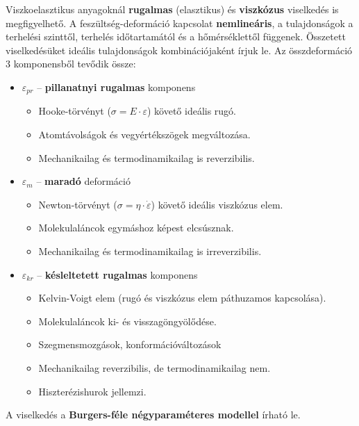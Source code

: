 \documentclass[12pt,a4paper]{article}       %
\begin{document}
\begin{tcbitemize}
  \tcbitem[title={\# \thetcbrasternum{} –
        Mit jelent az, hogy egy polimer viszkoelasztikus?
      }]
  Viszkoelasztikus anyagoknál \textbf{rugalmas} (elasztikus) és
  \textbf{viszkózus} viselkedés is megfigyelhető. A feszültség-deformáció
  kapcsolat \textbf{nemlineáris}, a tulajdonságok a terhelési szinttől,
  terhelés időtartamától és a hőmérséklettől függenek. Összetett viselkedésüket
  ideális tulajdonságok kombinációjaként írjuk le. Az összdeformáció 3
  komponensből tevődik össze:
  \begin{itemize}
    \item $\varepsilon_{pr}$ – \textbf{pillanatnyi rugalmas} komponens
          \begin{itemize}
            \item Hooke-törvényt ($\sigma = E \cdot \varepsilon$) követő
                  ideális rugó.
            \item Atomtávolságok és vegyértékszögek megváltozása.
            \item Mechanikailag és termodinamikailag is reverzibilis.
          \end{itemize}
    \item $\varepsilon_{m}$ – \textbf{maradó} deformáció
          \begin{itemize}
            \item Newton-törvényt ($\sigma = \eta \cdot \dot{\varepsilon}$)
                  követő ideális viszkózus elem.
            \item Molekulaláncok egymáshoz képest elcsúsznak.
            \item Mechanikailag és termodinamikailag is irreverzibilis.
          \end{itemize}
    \item $\varepsilon_{kr}$ – \textbf{késleltetett rugalmas} komponens
          \begin{itemize}
            \item Kelvin-Voigt elem (rugó és viszkózus elem páthuzamos
                  kapcsolása).
            \item Molekulaláncok ki- és visszagöngyölődése.
            \item Szegmensmozgások, konformációváltozások
            \item Mechanikailag reverzibilis, de termodinamikailag nem.
            \item Hiszterézishurok jellemzi.
          \end{itemize}
  \end{itemize}
  A viselkedés a \textbf{Burgers-féle négyparaméteres modellel} írható le.




\end{tcbitemize}
\end{document}
